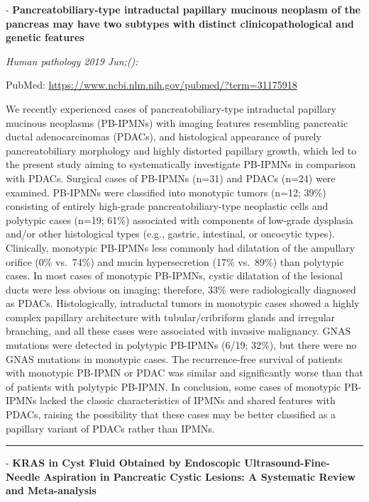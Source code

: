 \documentclass[]{article}
\begin{document}
 - \textbf{Pancreatobiliary-type intraductal papillary mucinous neoplasm
of the pancreas may have two subtypes with distinct clinicopathological
and genetic features}

\emph{Human pathology 2019 Jun;():}

PubMed: \url{https://www.ncbi.nlm.nih.gov/pubmed/?term=31175918}

We recently experienced cases of pancreatobiliary-type intraductal
papillary mucinous neoplasms (PB-IPMNs) with imaging features resembling
pancreatic ductal adenocarcinomas (PDACs), and histological appearance
of purely pancreatobiliary morphology and highly distorted papillary
growth, which led to the present study aiming to systematically
investigate PB-IPMNs in comparison with PDACs. Surgical cases of
PB-IPMNs (n=31) and PDACs (n=24) were examined. PB-IPMNs were classified
into monotypic tumors (n=12; 39\%) consisting of entirely high-grade
pancreatobiliary-type neoplastic cells and polytypic cases (n=19; 61\%)
associated with components of low-grade dysplasia and/or other
histological types (e.g., gastric, intestinal, or oncocytic types).
Clinically, monotypic PB-IPMNs less commonly had dilatation of the
ampullary orifice (0\% vs.~74\%) and mucin hypersecretion (17\%
vs.~89\%) than polytypic cases. In most cases of monotypic PB-IPMNs,
cystic dilatation of the lesional ducts were less obvious on imaging;
therefore, 33\% were radiologically diagnosed as PDACs. Histologically,
intraductal tumors in monotypic cases showed a highly complex papillary
architecture with tubular/cribriform glands and irregular branching, and
all these cases were associated with invasive malignancy. GNAS mutations
were detected in polytypic PB-IPMNs (6/19; 32\%), but there were no GNAS
mutations in monotypic cases. The recurrence-free survival of patients
with monotypic PB-IPMN or PDAC was similar and significantly worse than
that of patients with polytypic PB-IPMN. In conclusion, some cases of
monotypic PB-IPMNs lacked the classic characteristics of IPMNs and
shared features with PDACs, raising the possibility that these cases may
be better classified as a papillary variant of PDACs rather than IPMNs.

{}

{}

\begin{center}\rule{0.5\linewidth}{\linethickness}\end{center}

 - \textbf{KRAS in Cyst Fluid Obtained by Endoscopic
Ultrasound-Fine-Needle Aspiration in Pancreatic Cystic Lesions: A
Systematic Review and Meta-analysis}
\end{document}
